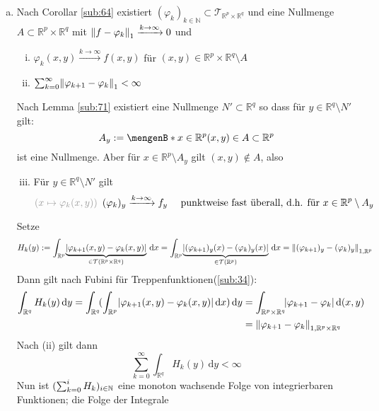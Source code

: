 \begin{enumerate}[a)]
	\item Nach Corollar \ref{sub:64} existiert $(\varphi_k)_{k \in \mathds{N}} \subset \mathcal{T}_{\mathds{R}^p \times \mathds{R}^q}$ und eine Nullmenge 
	$A \subset \mathds{R}^p \times \mathds{R}^q$ mit $\norm[1]{f- \varphi_k} \xrightarrow{k \to \infty} 0 $ und 
	\begin{enumerate}[(i)]
		\item $\varphi_k(x,y) \xrightarrow{k \to \infty} f(x,y)$ für $(x,y) \in \mathds{R}^p \times \mathds{R}^q \setminus A$
		\item $ \sum_{k=0}^{\infty} \norm[1]{\varphi_{k+1} - \varphi_k} < \infty $
	\end{enumerate}
	Nach Lemma \ref{sub:71} existiert eine Nullmenge $N' \subset \mathds{R}^q$ so dass für $y \in \mathds{R}^q\setminus N'$ gilt:
	\[
		A_y := \set[x \in \mathds{R}^p]{(x,y) \in A} \subset \mathds{R}^p 
	\]
	ist eine Nullmenge. Aber für $x \in \mathds{R}^p \setminus A_y$ gilt $(x,y) \not\in A$, also 
	\begin{enumerate}[(i)]
		\setcounter{enumii}{2}
		\item Für $y \in \mathds{R}^q \setminus N'$ gilt
		\[
			{\color{light_gray}(x \mapsto \varphi_k (x,y) )} \enspace(\varphi_k)_y \xrightarrow{k \to \infty} f_y \quad \text{ punktweise fast überall, d.h. für } x \in 
			\mathds{R}^p \setminus A_y
		\]
	\end{enumerate}
	Setze 
	\[
		H_k(y) := \int_{\mathds{R}^p}\! \underbrace{\abs{\varphi_{k+1}(x,y) - \varphi_k(x,y)}}_{\in \mathcal{T}(\mathds{R}^p \times \mathds{R}^q)}  \, \mathrm{d}x   
		= \int_{\mathds{R}^p}\! \underbrace{\abs{(\varphi_{k+1})_y (x) - 
		(\varphi_k)_y (x)}}_{\in \mathcal{T}(\mathds{R}^p)}  \, \mathrm{d}x  = \norm[1,\mathds{R}^p]{(\varphi_{k+1})_y - (\varphi_k)_y} 
	\]
	Dann gilt nach Fubini für Treppenfunktionen(\ref{sub:34}):
	\begin{align*}
		\int_{\mathds{R}^q} H_k(y)  \, \mathrm{d}y = \int_{\mathds{R}^q}\! \enbrace{\int_{\mathds{R}^p} \abs{\varphi_{k+1} (x,y)- \varphi_k(x,y)}  \, \mathrm{d}x  }  
		\, \mathrm{d}y &= \int_{\mathds{R}^p \times \mathds{R}^q}\! \abs{\varphi_{k+1} - \varphi_k}  \, \mathrm{d}(x,y)\\
		&= \norm[1,\mathds{R}^p \times \mathds{R}^q]{\varphi_{k+1} - \varphi_k}
	\end{align*}
	Nach (ii) gilt dann
	\[
		\sum_{k=0}^{\infty} \int_{\mathds{R}^q}\! H_k(y)  \, \mathrm{d}y < \infty \tag{$\star$}
	\]
	Nun ist $(\sum_{k=0}^{i} H_k)_{i \in \mathbb{N}}$ eine monoton wachsende Folge von integrierbaren Funktionen; die Folge der Integrale 

\end{enumerate}

